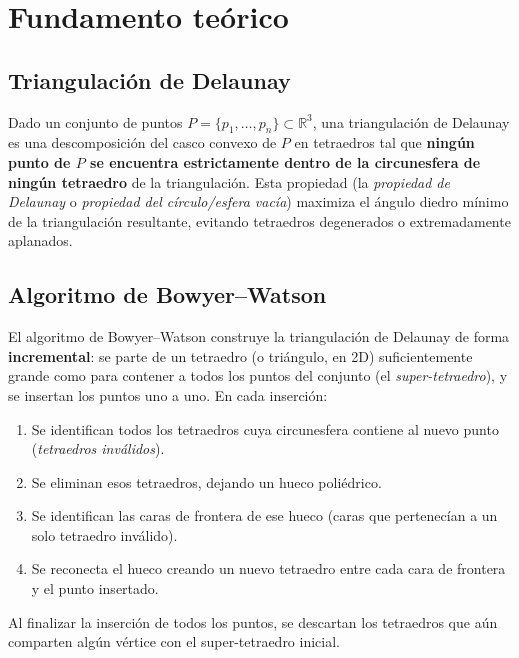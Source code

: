 \documentclass[12pt,a4paper]{article}
\begin{document}
\section{Fundamento teórico}

\subsection{Triangulación de Delaunay}

Dado un conjunto de puntos $P = \{p_1, \dots, p_n\} \subset
\mathbb{R}^3$, una triangulación de Delaunay es una descomposición del
casco convexo de $P$ en tetraedros tal que \textbf{ningún punto de $P$
se encuentra estrictamente dentro de la circunesfera de ningún
tetraedro} de la triangulación. Esta propiedad (la \emph{propiedad de
Delaunay} o \emph{propiedad del círculo/esfera vacía}) maximiza el
ángulo diedro mínimo de la triangulación resultante, evitando
tetraedros degenerados o extremadamente aplanados.

\subsection{Algoritmo de Bowyer--Watson}

El algoritmo de Bowyer--Watson \cite{bowyer1981,watson1981}
construye la triangulación de Delaunay de forma \textbf{incremental}:
se parte de un tetraedro (o triángulo, en 2D) suficientemente grande
como para contener a todos los puntos del conjunto (el
\emph{super-tetraedro}), y se insertan los puntos uno a uno. En cada
inserción:

\begin{enumerate}
    \item Se identifican todos los tetraedros cuya circunesfera
    contiene al nuevo punto (\emph{tetraedros inválidos}).
    \item Se eliminan esos tetraedros, dejando un hueco poliédrico.
    \item Se identifican las caras de frontera de ese hueco (caras que
    pertenecían a un solo tetraedro inválido).
    \item Se reconecta el hueco creando un nuevo tetraedro entre cada
    cara de frontera y el punto insertado.
\end{enumerate}

Al finalizar la inserción de todos los puntos, se descartan los
tetraedros que aún comparten algún vértice con el super-tetraedro
inicial.
\end{document}

